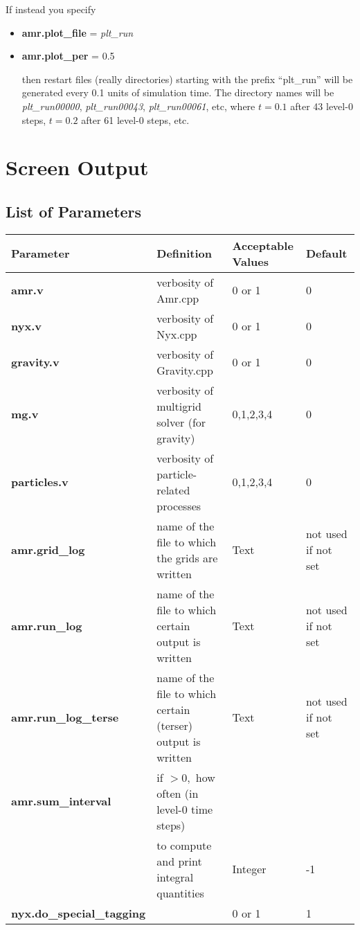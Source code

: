 If instead you specify

\begin{itemize}

\item {\bf amr.plot\_file} = {\em plt\_run}
\item {\bf amr.plot\_per} = 0.5

then restart files (really directories) starting with the prefix ``plt\_run'' will be
generated every 0.1 units of simulation time.  The directory names will be {\em plt\_run00000}, 
{\em plt\_run00043}, {\em plt\_run00061}, etc, where $t = 0.1$ after 43 level-0 steps, 
$t = 0.2$ after 61 level-0 steps, etc.

\end{itemize}

\section{Screen Output}

\subsection{List of Parameters}

\begin{table*}[h]
\begin{scriptsize}
\begin{center}
\begin{tabular}{|l|l|l|l|} \hline
Parameter & Definition & Acceptable Values &Default\\
\hline
{\bf amr.v} & verbosity of Amr.cpp & 0 or 1 & 0 \\
{\bf nyx.v} & verbosity of Nyx.cpp & 0 or 1 & 0 \\
{\bf gravity.v} & verbosity of Gravity.cpp & 0 or 1 & 0 \\
{\bf mg.v} & verbosity of multigrid solver (for gravity) & 0,1,2,3,4 & 0 \\
{\bf particles.v} & verbosity of particle-related processes & 0,1,2,3,4 & 0 \\
{\bf amr.grid\_log}       & name of the file to which the grids are written & Text & not used if not set \\
{\bf amr.run\_log}        & name of the file to which certain output is written & Text & not used if not set \\
{\bf amr.run\_log\_terse} & name of the file to which certain (terser) output is written & Text & not used if not set \\
{\bf amr.sum\_interval}   & if $> 0,$ how often (in level-0 time steps) & &  \\  
                          & to compute and print integral quantities & Integer & -1 \\  
{\bf nyx.do\_special\_tagging} & & 0 or 1 & 1 \\
\hline
\end{tabular}
\end{center}
\end{scriptsize}
\end{table*}

